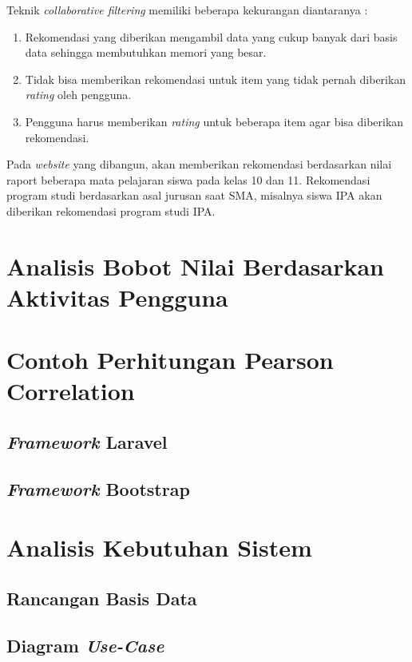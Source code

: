 Teknik \textit{collaborative filtering} memiliki beberapa kekurangan diantaranya : 

\begin{enumerate}
    \item Rekomendasi yang diberikan mengambil data yang cukup banyak dari basis data sehingga membutuhkan memori yang besar.
    
    \item Tidak bisa memberikan rekomendasi untuk item yang tidak pernah diberikan \textit{rating} oleh pengguna.
    
    \item Pengguna harus memberikan \textit{rating} untuk beberapa item agar bisa diberikan rekomendasi.
\end{enumerate}

Pada \textit{website} yang dibangun, akan memberikan rekomendasi berdasarkan nilai raport beberapa mata pelajaran siswa pada kelas 10 dan 11. Rekomendasi program studi berdasarkan asal jurusan saat SMA, misalnya siswa IPA akan diberikan rekomendasi program studi IPA.

\section{Analisis Bobot Nilai Berdasarkan Aktivitas Pengguna}

\section{Contoh Perhitungan Pearson Correlation}

\subsection{\textit{Framework} Laravel}

\subsection{\textit{Framework} Bootstrap}

\section{Analisis Kebutuhan Sistem}

\subsection{Rancangan Basis Data}

\subsection{Diagram \textit{Use-Case}}

